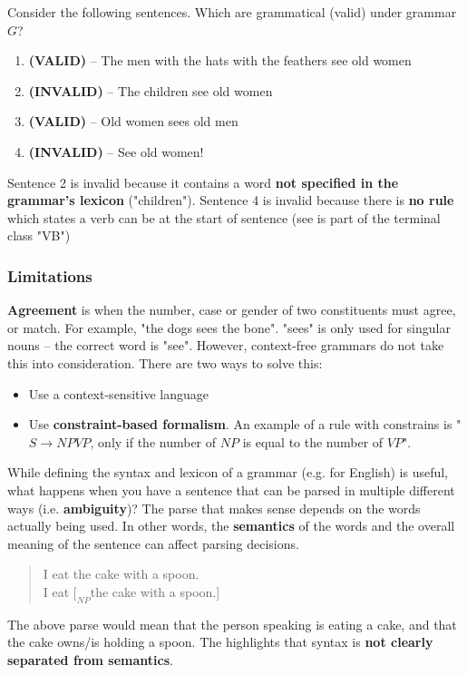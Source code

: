 \documentclass{article}
\begin{document}
Consider the following sentences. Which are grammatical (valid) under grammar $G$?
\begin{enumerate}
	\item \textbf{(VALID)} -- The men with the hats with the feathers see old women
	\item \textbf{(INVALID)} -- The children see old women
	\item \textbf{(VALID)}  -- Old women sees old men
	\item \textbf{(INVALID)} -- See old women!
\end{enumerate}
Sentence 2 is invalid because it contains a word \textbf{not specified in the grammar's lexicon} ("children").  Sentence 4 is invalid because there is \textbf{no rule} which states a verb can be at the start of sentence (see is part of the terminal class "VB")

\subsubsection{Limitations}

\textbf{Agreement} is when  the number, case or gender of two constituents must agree, or match. For example, "the dogs sees the bone". "sees" is only used for singular nouns -- the correct word is "see". However, context-free grammars do not take this into consideration. There are two ways to solve this:
\begin{itemize}
	\item Use a context-sensitive language
	\item Use \textbf{constraint-based formalism}. An example of a rule with constrains is "$S \rightarrow NP VP$, only if the number of $NP$ is equal to the number of $VP$".
\end{itemize}

While defining the syntax and lexicon of a grammar (e.g. for English) is useful, what happens when you have a sentence that can be parsed in multiple different ways (i.e. \textbf{ambiguity})? The parse that makes sense depends on the words actually being used. In other words, the \textbf{semantics} of the words and the overall meaning of the sentence can affect parsing decisions.
\begin{quote}
	I eat the cake with a spoon. \\
	I eat $[_{NP}$the cake with a spoon.]
\end{quote}
The above parse would mean that the person speaking is eating a cake, and that the cake owns/is holding a spoon. The highlights that syntax is \textbf{not clearly separated from semantics}.
\end{document}

